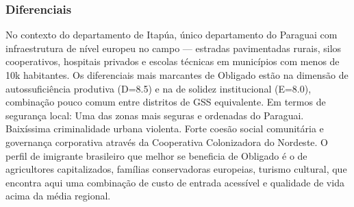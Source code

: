 \subsubsection*{Diferenciais}\label{dif-obligado-0717}
No contexto do departamento de Itapúa, único departamento do Paraguai com infraestrutura de nível europeu no campo — estradas pavimentadas rurais, silos cooperativos, hospitais privados e escolas técnicas em municípios com menos de 10k habitantes. Os diferenciais mais marcantes de Obligado estão na dimensão de autossuficiência produtiva (D=8.5) e na de solidez institucional (E=8.0), combinação pouco comum entre distritos de GSS equivalente. Em termos de segurança local: Uma das zonas mais seguras e ordenadas do Paraguai. Baixíssima criminalidade urbana violenta. Forte coesão social comunitária e governança corporativa através da Cooperativa Colonizadora do Nordeste. O perfil de imigrante brasileiro que melhor se beneficia de Obligado é o de agricultores capitalizados, famílias conservadoras europeias, turismo cultural, que encontra aqui uma combinação de custo de entrada acessível e qualidade de vida acima da média regional.
